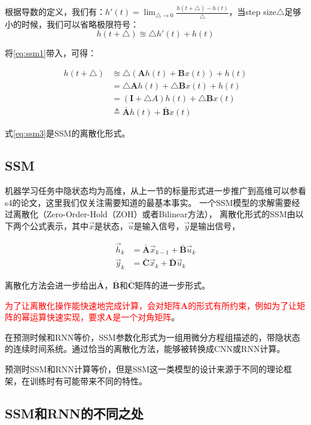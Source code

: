 根据导数的定义，我们有：$h'(t) = \lim_{\triangle \rightarrow 0}\frac{h(t+\triangle)-h(t)}{\triangle}$，当step size$\triangle$足够小的时候，我们可以省略极限符号：
$$h(t + \triangle) \approxeq \triangle h'(t) + h(t)$$

将\eqref{eq:ssm1}带入，可得：

\begin{align}
    h(t+\triangle) & \approxeq \triangle \left( \mathbf{A}h(t) + \mathbf{B}x(t)\right) + h(t) \nonumber \\
    &=\triangle \mathbf{A} h(t) + \triangle \mathbf{B}x(t)+h(t) \nonumber \\
    &=\left(\mathbf{I} +\triangle A\right)h(t) + \triangle \mathbf{B} x(t) \nonumber \\
    &\triangleq \bar{\mathbf{A}}h(t) + \bar{\mathbf{B}}x(t) \label{eq:ssm3}
\end{align}

式\eqref{eq:ssm3}是SSM的离散化形式。

\subsection{SSM}

机器学习任务中隐状态均为高维，从上一节的标量形式进一步推广到高维可以参看s4\cite{gu2021efficiently}的论文，这里我们仅关注需要知道的最基本事实。
一个SSM模型的求解需要经过离散化（Zero-Order-Hold（ZOH）或者Bilinear方法），
离散化形式的SSM由以下两个公式表示，其中$\vec{x}$是状态，$\vec{u}$是输入信号，$\vec{y}$是输出信号，

\begin{align}
  \vec{h}_k &= \bar{\mathbf{A}}\vec{x}_{k-1} + \bar{\mathbf{B}}\vec{u}_k \label{eq:ssm4}\\
  \vec{y}_k &= \bar{\mathbf{C}}\vec{x}_k + \bar{\mathbf{D}}\vec{u}_k 
\end{align}

离散化方法会进一步给出$\bar{\mathbf{A}}$，$\bar{\mathbf{B}}$和$\bar{\mathbf{C}}$矩阵的进一步形式。

\textcolor{red}{为了让离散化操作能快速地完成计算，会对矩阵$\mathbf{A}$的形式有所约束，例如为了让矩阵的幂运算快速实现，要求$\mathbf{A}$是一个对角矩阵}。

在预测时候和RNN等价，SSM参数化形式为一组用微分方程组描述的，带隐状态的连续时间系统。通过恰当的离散化方法，能够被转换成CNN或RNN计算。

预测时SSM和RNN计算等价，但是SSM这一类模型的设计来源于不同的理论框架，在训练时有可能带来不同的特性。

\subsection{SSM和RNN的不同之处}

